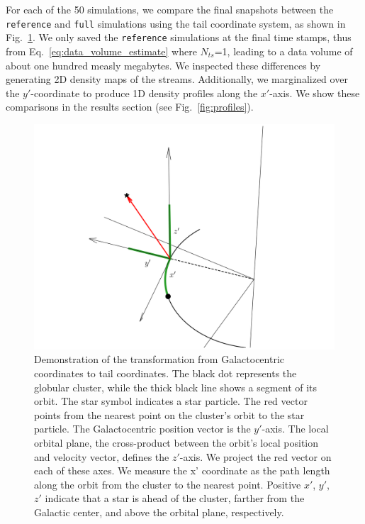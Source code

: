         For each of the 50 simulations, we compare the final snapshots between the \texttt{reference} and \texttt{full} simulations using the tail coordinate system, as shown in Fig.~\ref{fig:TailCoordinates}. We only saved the \texttt{reference} simulations at the final time stamps, thus from Eq.~\ref{eq:data_volume_estimate} where $N_{ts}$=1, leading to a data volume of about one hundred measly megabytes. We inspected these differences by generating 2D density maps of the streams. Additionally, we marginalized over the $y'$-coordinate to produce 1D density profiles along the $x'$-axis. We show these comparisons in the results section (see Fig.~\ref{fig:profiles}).
        \begin{figure}
            \centering
            \includegraphics[width=\linewidth]{images/tailcoordinates.png}
            \caption{Demonstration of the transformation from Galactocentric coordinates to tail coordinates. The black dot represents the globular cluster, while the thick black line shows a segment of its orbit. The star symbol indicates a star particle. The red vector points from the nearest point on the cluster's orbit to the star particle. The Galactocentric position vector is the $y'$-axis. The local orbital plane, the cross-product between the orbit's local position and velocity vector, defines the $z'$-axis. We project the red vector on each of these axes. We measure the x' coordinate as the path length along the orbit from the cluster to the nearest point. Positive $x'$, $y'$, $z'$ indicate that a star is ahead of the cluster, farther from the Galactic center, and above the orbital plane, respectively.}
            \label{fig:TailCoordinates}
        \end{figure}
  
